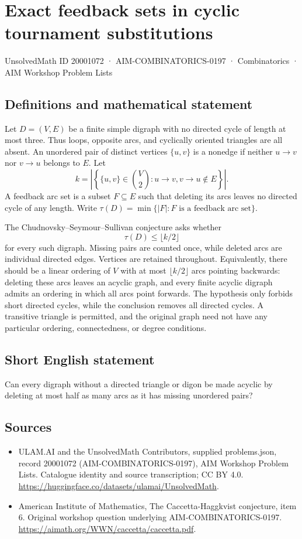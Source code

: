 \documentclass[11pt,a4paper]{article}
\begin{document}
\section*{Exact feedback sets in cyclic tournament substitutions}\label{20001072}
{\small UnsolvedMath ID 20001072 · AIM-COMBINATORICS-0197 · Combinatorics · AIM Workshop Problem Lists}
\subsection{Definitions and mathematical statement}
Let $D=(V,E)$ be a finite simple digraph with no directed cycle of
length at most three. Thus loops, opposite arcs, and cyclically
oriented triangles are all absent. An unordered pair of distinct
vertices $\{u,v\}$ is a nonedge if neither $u\to v$ nor $v\to u$
belongs to $E$. Let
\[
             k=\left|\left\{\{u,v\}\in\binom V2:
                          u\to v,v\to u\notin E\right\}\right|.
\]
A feedback arc set is a subset $F\subseteq E$ such that deleting
its arcs leaves no directed cycle of any length. Write
$\tau(D)=\min\{|F|:F\text{ is a feedback arc set}\}$.

The Chudnovsky--Seymour--Sullivan conjecture asks whether
\[
                              \tau(D)\le\lfloor k/2\rfloor
\]
for every such digraph. Missing pairs are counted once, while deleted
arcs are individual directed edges. Vertices are retained throughout.
Equivalently, there should be a linear ordering of $V$ with at most
$\lfloor k/2\rfloor$ arcs pointing backwards: deleting these arcs
leaves an acyclic graph, and every finite acyclic digraph admits an
ordering in which all arcs point forwards.
The hypothesis only forbids short directed cycles, while the
conclusion removes all directed cycles. A transitive triangle is
permitted, and the original graph need not have any particular
ordering, connectedness, or degree conditions.
\subsection{Short English statement}
Can every digraph without a directed triangle or digon be made acyclic by deleting at most half as many arcs as it has missing unordered pairs?
\subsection{Sources}
\begin{itemize}
\item[S1] ULAM.AI and the UnsolvedMath Contributors, supplied problems.json, record 20001072 (AIM-COMBINATORICS-0197), AIM Workshop Problem Lists. Catalogue identity and source transcription; CC BY 4.0.
\url{https://huggingface.co/datasets/ulamai/UnsolvedMath}.
\item[S2] American Institute of Mathematics, The Caccetta-Haggkvist conjecture, item 6. Original workshop question underlying AIM-COMBINATORICS-0197.
\url{https://aimath.org/WWN/caccetta/caccetta.pdf}.
\end{itemize}
\end{document}
